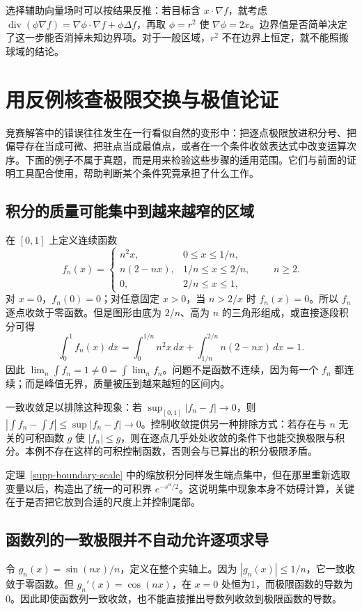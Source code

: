 \documentclass[12pt,fontset=fandol]{ctexart}
\begin{document}
选择辅助向量场时可以按结果反推：若目标含 $x\cdot\nabla f$，就考虑 $\operatorname{div}(\phi\nabla f)=\nabla\phi\cdot\nabla f+\phi\Delta f$，再取 $\phi=r^2$ 使 $\nabla\phi=2x$。边界值是否简单决定了这一步能否消掉未知边界项。对于一般区域，$r^2$ 不在边界上恒定，就不能照搬球域的结论。

\section{用反例核查极限交换与极值论证}\label{sec:supp-counterexamples}
竞赛解答中的错误往往发生在一行看似自然的变形中：把逐点极限放进积分号、把偏导存在当成可微、把驻点当成最值点，或者在一个条件收敛表达式中改变运算次序。下面的例子不属于真题，而是用来检验这些步骤的适用范围。它们与前面的证明工具配合使用，帮助判断某个条件究竟承担了什么工作。

\subsection{积分的质量可能集中到越来越窄的区域}
在 $[0,1]$ 上定义连续函数
\[
 f_n(x)=\begin{cases}
 n^2x,&0\leq x\leq1/n,\\
 n(2-nx),&1/n\leq x\leq2/n,\\
 0,&2/n\leq x\leq1,
 \end{cases}\qquad n\geq2.
\]
对 $x=0$，$f_n(0)=0$；对任意固定 $x>0$，当 $n>2/x$ 时 $f_n(x)=0$。所以 $f_n$ 逐点收敛于零函数。但是图形由底为 $2/n$、高为 $n$ 的三角形组成，或直接逐段积分可得
\[
 \int_0^1f_n(x)\,dx
 =\int_0^{1/n}n^2x\,dx+
   \int_{1/n}^{2/n}n(2-nx)\,dx=1.
\]
因此 $\lim_n\int f_n=1\ne0=\int\lim_nf_n$。问题不是函数不连续，因为每一个 $f_n$ 都连续；而是峰值无界，质量被压到越来越短的区间内。

一致收敛足以排除这种现象：若 $\sup_{[0,1]}|f_n-f|\to0$，则 $|\int f_n-\int f|\leq\sup|f_n-f|\to0$。控制收敛提供另一种排除方式：若存在与 $n$ 无关的可积函数 $g$ 使 $|f_n|\leq g$，则在逐点几乎处处收敛的条件下也能交换极限与积分。本例不存在这样的可积控制函数，否则会与已算出的积分极限矛盾。

定理~\ref{supp-boundary-scale} 中的缩放积分同样发生端点集中，但在那里重新选取变量以后，构造出了统一的可积界 $e^{-s^\alpha/2}$。这说明集中现象本身不妨碍计算，关键在于是否把它放到合适的尺度上并控制尾部。

\subsection{函数列的一致极限并不自动允许逐项求导}
令 $g_n(x)=\sin(nx)/n$，定义在整个实轴上。因为 $|g_n(x)|\leq1/n$，它一致收敛于零函数。但 $g_n'(x)=\cos(nx)$，在 $x=0$ 处恒为1，而极限函数的导数为0。因此即使函数列一致收敛，也不能直接推出导数列收敛到极限函数的导数。
\end{document}
